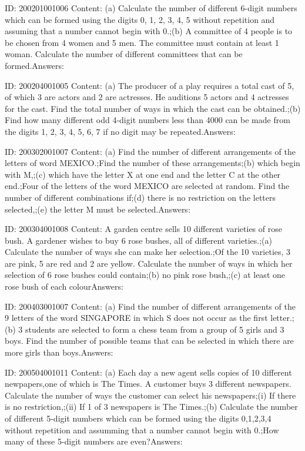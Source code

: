 \documentclass{article}
\begin{document}
ID: 200201001006
Content:
(a)	Calculate the number of different 6-digit numbers which can be formed using the digits 0, 1, 2, 3, 4, 5 without repetition and assuming that a number cannot begin with 0.;(b)	A committee of 4 people is to be chosen from 4 women and 5 men. The committee must contain at least 1 woman. Calculate the number of different committees that can be formed.Answers:

ID: 200204001005
Content:
(a)	The producer of a play requires a total cast of 5, of which 3 are actors and 2 are actresses. He auditions 5 actors and 4 actresses for the cast. Find the total number of ways in which the cast can be obtained.;(b)	Find how many different odd 4-digit numbers less than 4000 can be made from the digits 1, 2, 3, 4, 5, 6, 7 if no digit may be repeated.Answers:

ID: 200302001007
Content:
(a)	Find the number of different arrangements of the letters of word MEXICO.;Find the number of these arrangements;(b)	which begin with M,;(c)	which have the letter X at one end and the letter C at the other end.;Four of the letters of the word MEXICO are selected at random. Find the number of different combinations if;(d)	there is no restriction on the letters selected,;(e)	the letter M must be selected.Answers:

ID: 200304001008
Content:
A garden centre sells 10 different varieties of rose bush. A gardener wishes to buy 6 rose bushes, all of different varieties.;(a)	Calculate the number of ways she can make her selection.;Of the 10 varieties, 3 are pink, 5 are red and 2 are yellow. Calculate the number of ways in which her selection of 6 rose bushes could contain;(b)	no pink rose bush,;(c)	at least one rose bush of each colourAnswers:

ID: 200403001007
Content:
(a)	Find the number of different arrangements of the 9 letters of the word SINGAPORE in which S does not occur as the first letter.;(b)	3 students are selected to form a chess team from a group of 5 girls and 3 boys. Find the number of possible teams that can be selected in which there are more girls than boys.Answers:

ID: 200504001011
Content:
(a)	Each day a new agent sells copies of 10 different newpapers,one of which is The Times. A customer buys 3 different newspapers. Calculate the number of ways the customer can select his newspapers;(i)	If there is no restriction,;(ii)	If 1 of 3 newspapers is The Times.;(b)	Calculate the number of different 5-digit numbers which can be formed using the digits 0,1,2,3,4 without repetition and assumming that a number cannot begin with 0.;How many of these 5-digit numbers are even?Answers:
\end{document}
